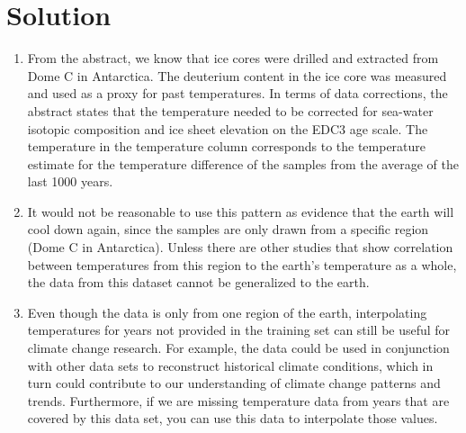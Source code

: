 \documentclass[submit]{harvardml}
\newenvironment{solution}
  {\color{magenta}\section*{Solution}}
{}
\begin{document}
\begin{solution}
\begin{enumerate}
    \item From the abstract, we know that ice cores were drilled and extracted from Dome C in Antarctica. The deuterium content in the ice core was measured and used as a proxy for past temperatures. In terms of data corrections, the abstract states that the temperature needed to be corrected for sea-water isotopic composition and ice sheet elevation on the EDC3 age scale. The temperature in the temperature column corresponds to the temperature estimate for the temperature difference of the samples from the average of the last 1000 years. 
    
    \item It would not be reasonable to use this pattern as evidence that the earth will cool down again, since the samples are only drawn from a specific region (Dome C in Antarctica). Unless there are other studies that show correlation between temperatures from this region to the earth's temperature as a whole, the data from this dataset cannot be generalized to the earth. 
    
    \item Even though the data is only from one region of the earth, interpolating temperatures for years not provided in the training set can still be useful for climate change research. For example, the data could be used in conjunction with other data sets to reconstruct historical climate conditions, which in turn could contribute to our understanding of climate change patterns and trends. Furthermore, if we are missing temperature data from years that are covered by this data set, you can use this data to interpolate those values.
\end{enumerate}
\end{solution}

\end{document}
